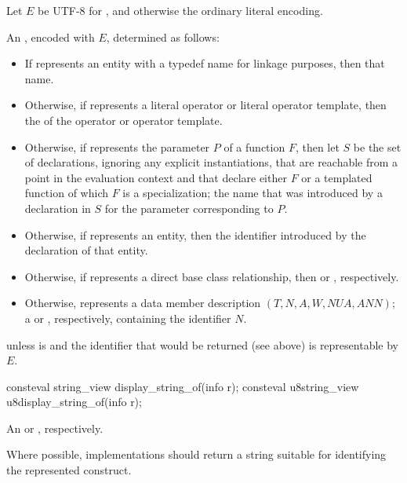\begin{itemdescr}
\pnum
Let $E$ be UTF-8 for ,
and otherwise the ordinary literal encoding.

\pnum
\returns
An \ntmbs{}, encoded with $E$,
determined as follows:
\begin{itemize}
\item
  If  represents an entity with a typedef name for linkage purposes,
  then that name.
\item
  Otherwise, if  represents a literal operator or literal operator template,
  then the  of the operator or operator template.
\item
  Otherwise, if  represents the parameter $P$ of a function $F$,
  then let $S$ be the set of declarations,
  ignoring any explicit instantiations,
  that are reachable from a point in the evaluation context
  and that declare either $F$
  or a templated function of which $F$ is a specialization;
  the name that was introduced by a declaration in $S$
  for the parameter corresponding to $P$.
\item
  Otherwise, if  represents an entity,
  then the identifier introduced by the declaration of that entity.
\item
  Otherwise, if  represents a direct base class relationship,
  then  or ,
  respectively.
\item
  Otherwise,  represents a data member description
  $(T, N, A, W, \mathit{NUA}, \mathit{ANN})$;
  a  or , respectively,
  containing the identifier $N$.
\end{itemize}

\pnum
\throws
{} unless
 is 
and the identifier that would be returned (see above)
is representable by $E$.
\end{itemdescr}

%
%
\begin{itemdecl}
consteval string_view display_string_of(info r);
consteval u8string_view u8display_string_of(info r);
\end{itemdecl}

\begin{itemdescr}
\pnum
\returns
An
 or , respectively.

\pnum
\recommended
Where possible,
implementations should return a string
suitable for identifying the represented construct.
\end{itemdescr}

